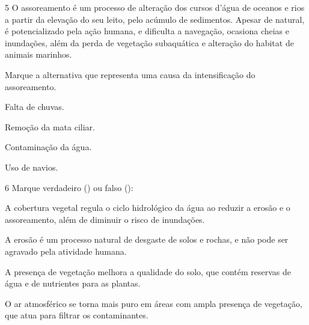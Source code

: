 \pagebreak
\num{5}
O assoreamento é um processo de alteração dos cursos
d'água de oceanos e rios a partir da elevação do seu leito, pelo acúmulo
de sedimentos. Apesar de natural, é potencializado pela ação humana, e
dificulta a navegação, ocasiona cheias e inundações, além da perda de
vegetação subaquática e alteração do habitat de animais marinhos.

Marque a alternativa que representa uma causa da intensificação do
assoreamento.

\begin{minipage}{.5\textwidth}
\begin{escolha}
\item Falta de chuvas.

\item Remoção da mata ciliar.

\item Contaminação da água.

\item Uso de navios.
\end{escolha}
\end{minipage}

\num{6} Marque verdadeiro () ou falso ():

\begin{boxlist}
 A cobertura vegetal regula o ciclo hidrológico da água ao reduzir 
a erosão e o assoreamento, além de diminuir o risco de inundações.

 A erosão é um processo natural de desgaste de solos e rochas, e 
não pode ser agravado pela atividade humana.

 A presença de vegetação melhora a qualidade do solo, que contém 
reservas de água e de nutrientes para as plantas.

 O ar atmosférico se torna mais puro em áreas com ampla presença de 
vegetação, que atua para filtrar os contaminantes.
\end{boxlist}


